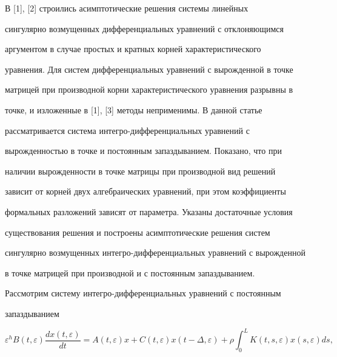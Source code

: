 \label{begin} 


 


 


 


 


В [1], [2] строились асимптотические решения системы линейных 


сингулярно возмущенных дифференциальных уравнений с отклоняющимся 


аргументом в случае простых и кратных корней характеристического 


уравнения. Для систем дифференциальных уравнений с вырожденной в точке 


матрицей при производной корни характеристического уравнения разрывны в 


точке, и изложенные в [1], [3] методы неприменимы. В данной статье 


рассматривается система интегро-дифференциальных уравнений с 


вырожденностью в точке и постоянным запаздыванием. Показано, что при 


наличии вырожденности в точке матрицы при производной вид решений 


зависит от корней двух алгебраических уравнений, при этом коэффициенты 


формальных разложений зависят от параметра. Указаны достаточные условия 


существования решения и построены асимптотические решения систем 


сингулярно возмущенных интегро-дифференциальных уравнений с вырожденной 


в точке матрицей при производной и с постоянным запаздыванием. 


 


 


Рассмотрим систему интегро-дифференциальных уравнений с постоянным 


запаздыванием 


\begin{equation} 


\varepsilon^h B(t,\varepsilon)\frac{dx(t,\varepsilon)}{dt} 


=A(t,\varepsilon)x+C(t,\varepsilon)x(t-\Delta,\varepsilon)+ 


\rho\int^L_0 K(t,s,\varepsilon) 


x(s,\varepsilon)ds, 


\end{equation} 


